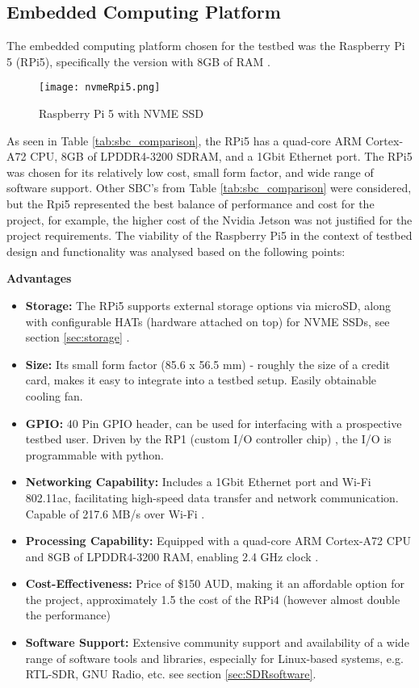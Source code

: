 \subsection{Embedded Computing Platform \label{sec:embedded computing}}


The embedded computing platform chosen for the testbed was the Raspberry Pi 5 (RPi5), specifically the version with 8GB of RAM \cite{core_electronics_rpi5}. 

\begin{figure}[htbp]
    \centering
    \texttt{[image: nvmeRpi5.png]}
    \caption{Raspberry Pi 5 with NVME SSD \cite{pimoroni_nvme_base}}
    \label{fig:Rpi5}
\end{figure}

As seen in Table \ref{tab:sbc_comparison}, the RPi5 has a quad-core ARM Cortex-A72 CPU, 8GB of LPDDR4-3200 SDRAM, and a 1Gbit Ethernet port. The RPi5 was chosen for its relatively low cost, small form factor, and wide range of software support. Other SBC's from Table \ref{tab:sbc_comparison} were considered, but the Rpi5 represented the best balance of performance and cost for the project, for example, the higher cost of the Nvidia Jetson was not justified for the project requirements. The viability of the Raspberry Pi5 in the context of testbed design and functionality was analysed based on the following points:

\noindent \textbf{Advantages}
\begin{itemize}
    \item \textbf{Storage:} The RPi5 supports external storage options via microSD, along with configurable HATs (hardware attached on top) for NVME SSDs, see section \ref{sec:storage} \cite{pimoroni_nvme_base}.
    \item \textbf{Size:} Its small form factor (85.6 x 56.5 mm) - roughly the size of a credit card, makes it easy to integrate into a testbed setup. Easily obtainable cooling fan.
    \item \textbf{GPIO:} 40 Pin GPIO header, can be used for interfacing with a prospective testbed user. Driven by the RP1 (custom I/O controller chip) \cite{core_electronics_rpi5}, the I/O is programmable with python.
    \item \textbf{Networking Capability:} Includes a 1Gbit Ethernet port and Wi-Fi 802.11ac, facilitating high-speed data transfer and network communication. Capable of 217.6 MB/s over Wi-Fi \cite{rpi5_wifi}.
    \item \textbf{Processing Capability:} Equipped with a quad-core ARM Cortex-A72 CPU and 8GB of LPDDR4-3200 RAM, enabling 2.4 GHz clock \cite{core_electronics_rpi5}.
    \item \textbf{Cost-Effectiveness:} Price of \$150 AUD, making it an affordable option for the project, approximately 1.5 the cost of the RPi4 (however almost double the performance) \cite{core_electronics_rpi5}
    \item \textbf{Software Support:} Extensive community support and availability of a wide range of software tools and libraries, especially for Linux-based systems, e.g. RTL-SDR, GNU Radio, etc. see section \ref{sec:SDRsoftware}.
\end{itemize}


